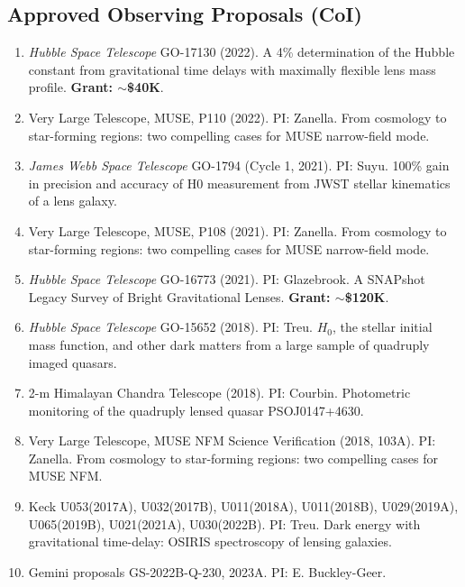 \documentclass[margin, line]{res}
\begin{document}
\begin{resume}
\section{\sc Approved Observing Proposals (CoI)}
\begin{enumerate}
\item \textit{Hubble Space Telescope} GO-17130 (2022). A 4\% determination of the Hubble constant from gravitational time delays with maximally flexible lens mass profile. \textbf{Grant: $\sim$\$40K}.
\item Very Large Telescope, MUSE, P110 (2022). PI: Zanella. From cosmology to star-forming regions: two compelling cases for MUSE narrow-field mode.
\item \textit{James Webb Space Telescope} GO-1794 (Cycle 1, 2021). PI: Suyu. 100\% gain in precision and accuracy of H0 measurement from JWST stellar kinematics of a lens galaxy. 
\item Very Large Telescope, MUSE, P108 (2021). PI: Zanella. From cosmology to star-forming regions: two compelling cases for MUSE narrow-field mode.
\item \textit{Hubble Space Telescope} GO-16773 (2021). PI: Glazebrook. A SNAPshot Legacy Survey of Bright Gravitational Lenses. \textbf{Grant: $\sim$\$120K}.
\item \textit{Hubble Space Telescope} GO-15652 (2018). PI: Treu. $H_0$, the stellar initial mass function, and other dark matters from a large sample of quadruply imaged quasars.
\item 2-m Himalayan Chandra Telescope (2018). PI: Courbin. Photometric monitoring of the quadruply lensed quasar PSOJ0147+4630.
\item Very Large Telescope, MUSE NFM Science Verification (2018, 103A). PI: Zanella. From cosmology to star-forming regions: two compelling cases for MUSE NFM.
\item Keck U053(2017A), U032(2017B), U011(2018A),  U011(2018B), U029(2019A), U065(2019B), U021(2021A), U030(2022B). PI: Treu. Dark energy with gravitational time-delay: OSIRIS spectroscopy of lensing galaxies.
\item Gemini proposals GS-2022B-Q-230, 2023A. PI: E. Buckley-Geer.
\end{enumerate}



\end{resume}
\end{document}
